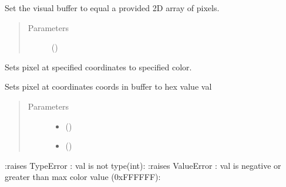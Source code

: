 \documentclass[letterpaper,10pt,english,openany,oneside]{sphinxmanual}
\begin{document}
\begin{fulllineitems}
\begin{fulllineitems}
\begin{quote}
\begin{description}
\end{description}\end{quote}

\end{fulllineitems}



\begin{fulllineitems}
\sphinxAtStartPar
Set the visual buffer to equal a provided 2D array of pixels.
\begin{quote}\begin{description}
\item[{Parameters}] \leavevmode
\sphinxAtStartPar
{} () \textendash{} 

\end{description}\end{quote}

\end{fulllineitems}



\begin{fulllineitems}
\sphinxAtStartPar
Sets pixel at specified coordinates to specified color.

\sphinxAtStartPar
Sets pixel at coordinates coords in buffer to hex value val
\begin{quote}\begin{description}
\item[{Parameters}] \leavevmode\begin{itemize}
\item {} 
\sphinxAtStartPar
{} (\sphinxstyleliteralemphasis{\sphinxupquote{ (}}\sphinxstyleliteralemphasis{\sphinxupquote{)}}) \textendash{} 

\item {} 
\sphinxAtStartPar
{} () \textendash{} 

\end{itemize}

\end{description}\end{quote}

\sphinxAtStartPar
:raises TypeError : val is not type(int):
:raises ValueError : val is negative or greater than max color value (0xFFFFFF):

\end{fulllineitems}


\end{fulllineitems}
\end{document}
